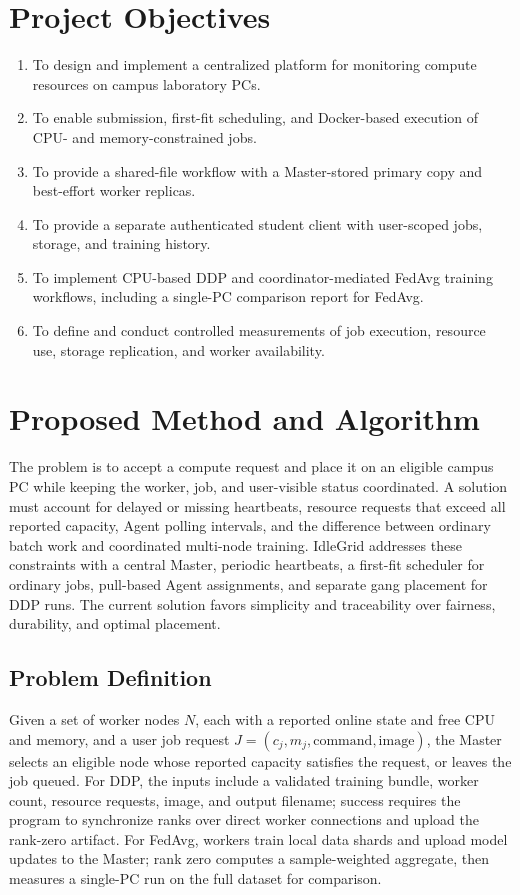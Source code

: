 \documentclass{article}
\begin{document}
	\section{Project Objectives}
    \begin{enumerate}
      \item To design and implement a centralized platform for monitoring compute resources on campus laboratory PCs.
      \item To enable submission, first-fit scheduling, and Docker-based execution of CPU- and memory-constrained jobs.
      \item To provide a shared-file workflow with a Master-stored primary copy and best-effort worker replicas.
  \item To provide a separate authenticated student client with user-scoped jobs, storage, and training history.
  \item To implement CPU-based DDP and coordinator-mediated FedAvg training workflows, including a single-PC comparison report for FedAvg.
      \item To define and conduct controlled measurements of job execution, resource use, storage replication, and worker availability.
    \end{enumerate}
	\pagebreak	
	\section{Proposed Method and Algorithm}
The problem is to accept a compute request and place it on an eligible campus PC while keeping the worker, job, and user-visible status coordinated. A solution must account for delayed or missing heartbeats, resource requests that exceed all reported capacity, Agent polling intervals, and the difference between ordinary batch work and coordinated multi-node training. IdleGrid addresses these constraints with a central Master, periodic heartbeats, a first-fit scheduler for ordinary jobs, pull-based Agent assignments, and separate gang placement for DDP runs. The current solution favors simplicity and traceability over fairness, durability, and optimal placement.

	\subsection{Problem Definition}

Given a set of worker nodes \(N\), each with a reported online state and free CPU and memory, and a user job request \(J=(c_j,m_j,\mathrm{command},\mathrm{image})\), the Master selects an eligible node whose reported capacity satisfies the request, or leaves the job queued. For DDP, the inputs include a validated training bundle, worker count, resource requests, image, and output filename; success requires the program to synchronize ranks over direct worker connections and upload the rank-zero artifact. For FedAvg, workers train local data shards and upload model updates to the Master; rank zero computes a sample-weighted aggregate, then measures a single-PC run on the full dataset for comparison.
\end{document}
